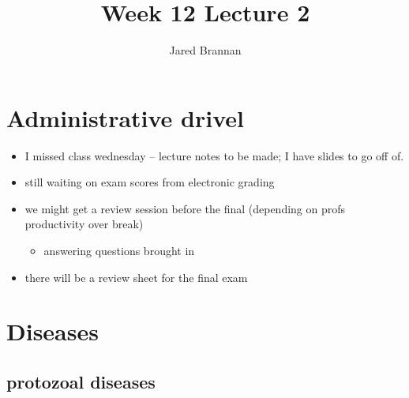 \documentclass{article}
\title{Week 12 Lecture 2}
\author{Jared Brannan }
\theoremstyle{definition}
\begin{document}
\maketitle

\section{Administrative drivel}
\begin{itemize}
	\item I missed class wednesday -- lecture notes to be made; I have slides to go off of.
	\item still waiting on exam scores from electronic grading
	\item we might get a review session before the final (depending on profs productivity over break)
		\begin{itemize}
			\item answering questions brought in
		\end{itemize}
	\item there will be a review sheet for the final exam
\end{itemize}

\section{Diseases}
\subsection{protozoal diseases}
\end{document}
